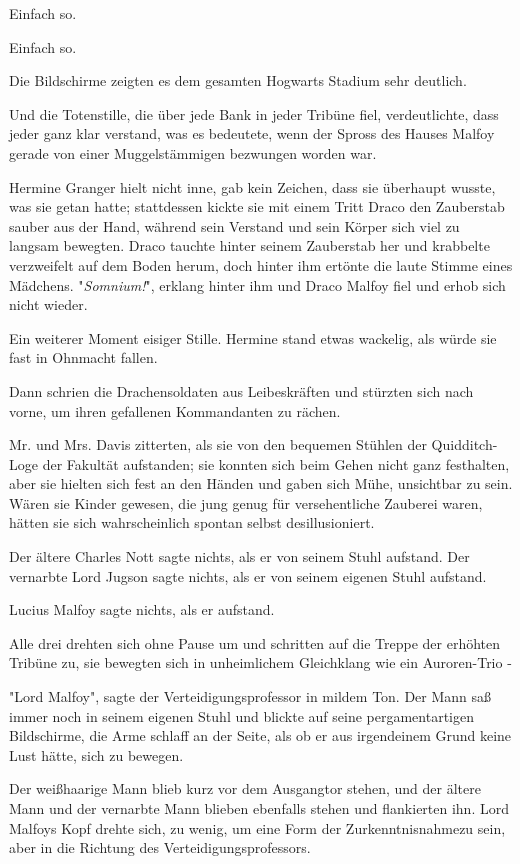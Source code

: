 {Einfach so.

Einfach so.

Die Bildschirme zeigten es dem gesamten Hogwarts Stadium sehr deutlich.

Und die Totenstille, die über jede Bank in jeder Tribüne fiel, verdeutlichte, dass jeder ganz klar verstand, was es bedeutete, wenn der Spross des Hauses Malfoy gerade von einer Muggelstämmigen bezwungen worden war.

Hermine Granger hielt nicht inne, gab kein Zeichen, dass sie überhaupt wusste, was sie getan hatte; stattdessen kickte sie mit einem Tritt Draco den Zauberstab sauber aus der Hand, während sein Verstand und sein Körper sich viel zu langsam bewegten. Draco tauchte hinter seinem Zauberstab her und krabbelte verzweifelt auf dem Boden herum, doch hinter ihm ertönte die laute Stimme eines Mädchens. "\emph{Somnium!}", erklang hinter ihm und Draco Malfoy fiel und erhob sich nicht wieder.

Ein weiterer Moment eisiger Stille. Hermine stand etwas wackelig, als würde sie fast in Ohnmacht fallen.

Dann schrien die Drachensoldaten aus Leibeskräften und stürzten sich nach vorne, um ihren gefallenen Kommandanten zu rächen.

Mr. und Mrs. Davis zitterten, als sie von den bequemen Stühlen der Quidditch-Loge der Fakultät aufstanden; sie konnten sich beim Gehen nicht ganz festhalten, aber sie hielten sich fest an den Händen und gaben sich Mühe, unsichtbar zu sein. Wären sie Kinder gewesen, die jung genug für versehentliche Zauberei waren, hätten sie sich wahrscheinlich spontan selbst desillusioniert.

Der ältere Charles Nott sagte nichts, als er von seinem Stuhl aufstand. Der vernarbte Lord Jugson sagte nichts, als er von seinem eigenen Stuhl aufstand.

Lucius Malfoy sagte nichts, als er aufstand.

Alle drei drehten sich ohne Pause um und schritten auf die Treppe der erhöhten Tribüne zu, sie bewegten sich in unheimlichem Gleichklang wie ein Auroren-Trio -

"Lord Malfoy", sagte der Verteidigungsprofessor in mildem Ton. Der Mann saß immer noch in seinem eigenen Stuhl und blickte auf seine pergamentartigen Bildschirme, die Arme schlaff an der Seite, als ob er aus irgendeinem Grund keine Lust hätte, sich zu bewegen.

Der weißhaarige Mann blieb kurz vor dem Ausgangtor stehen, und der ältere Mann und der vernarbte Mann blieben ebenfalls stehen und flankierten ihn. Lord Malfoys Kopf drehte sich, zu wenig, um eine Form der Zurkenntnisnahmezu sein, aber in die Richtung des Verteidigungsprofessors.

}

